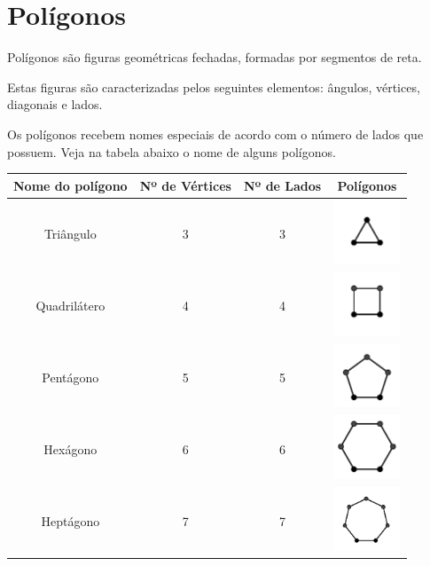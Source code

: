 \section{Polígonos}


\begin{obs}
 Polígonos são figuras geométricas fechadas, formadas por segmentos de reta.

  Estas figuras são caracterizadas pelos seguintes elementos: ângulos, vértices, diagonais e lados.
\end{obs}


  Os polígonos recebem nomes especiais de acordo com o número de lados que possuem. Veja na tabela abaixo o nome de alguns polígonos.


 \begin{table}[H]
 \centering
 \begin{tabular}{|c|c|c|c|} \hline
 \rowcolor{gray}
 Nome do polígono & Nº de Vértices & Nº de Lados & Polígonos  \\ \hline
 Triângulo & 3 & 3 & \includegraphics[width=2cm]{./cap_geometria/figs/pol3} \\ \hline
 Quadrilátero & 4 & 4 & \includegraphics[width=2cm]{./cap_geometria/figs/pol4} \\ \hline
 Pentágono & 5 & 5 & \includegraphics[width=2cm]{./cap_geometria/figs/pol5} \\ \hline
 Hexágono & 6 & 6 & \includegraphics[width=2cm]{./cap_geometria/figs/pol6} \\ \hline
 Heptágono & 7 & 7 & \includegraphics[width=2cm]{./cap_geometria/figs/pol7} \\ \hline

\end{tabular}
\end{table}
